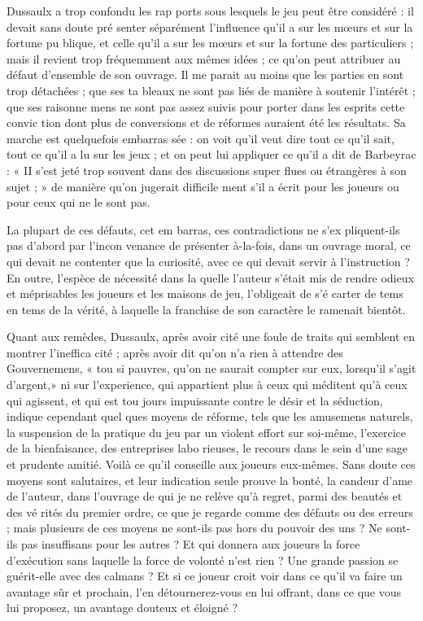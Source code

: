 Dussaulx a trop confondu les rap%
ports sous lesquels le jeu peut être
considéré : il devait sans doute pré%
senter séparément l'influence qu'il a
sur les mœurs et sur la fortune pu%
blique, et celle qu'il a sur les mœurs
et sur la fortune des particuliers ;
mais il revient trop fréquemment aux
mêmes idées ; ce qu'on peut attribuer
au défaut d'ensemble de son ouvrage.
Il me parait au moins que les parties
en sont trop détachées ; que ses ta%
bleaux ne sont pas liés de manière à
soutenir l'intérêt ; que ses raisonne%
mens ne sont pas assez suivis pour
porter dans les esprits cette convic%
tion dont plus de conversions et de
réformes auraient été les résultats.
Sa marche est quelquefois embarras%
sée : on voit qu'il veut dire tout ce
qu'il sait, tout ce qu'il a lu sur les
jeux ; et on peut lui appliquer ce qu'il
a dit de Barbeyrac : « II s'est jeté trop
souvent dans des discussions super%
flues ou étrangères à son sujet ; »
de manière qu'on jugerait difficile%
ment s'il a écrit pour les joueurs ou
pour ceux qui ne le sont pas.

La plupart de ces défauts, cet em%
barras, ces contradictions ne s'ex%
pliquent-ils pas d'abord par l'incon%
venance de présenter à-la-fois, dans
un ouvrage moral, ce qui devait ne
contenter que la curiosité, avec ce
qui devait servir à l'instruction ? En
outre, l'espèce de nécessité dans la%
quelle l'auteur s'était mis de rendre
odieux et méprisables les joueurs et
les maisons de jeu, l'obligeait de s'é%
carter de tems en tems de la vérité, à
laquelle la franchise de son caractère
le ramenait bientôt.

Quant aux remèdes, Dussaulx,
après avoir cité une foule de traits
qui semblent en montrer l'ineffica%
cité ; après avoir dit qu'on n'a rien à
attendre des Gouvernemens, « tou%
si pauvres, qu'on ne saurait 
compter sur eux, lorsqu'il s'agit
d'argent,» ni sur l'experience, qui
appartient plus à ceux qui méditent
qu'à ceux qui agissent, et qui est tou%
jours impuissante contre le désir et la
séduction, indique cependant quel%
ques moyens de réforme, tels que les
amusemens naturels, la suspension
de la pratique du jeu par un violent
effort sur soi-même, l'exercice de la
bienfaisance, des entreprises labo%
rieuses, le recours dans le sein d'une
sage et prudente amitié. Voilà ce qu'il
conseille aux joueurs eux-mêmes.
Sans doute ces moyens sont salutaires,
et leur indication seule prouve la
bonté, la candeur d'ame de l'auteur,
dans l'ouvrage de qui je ne relève qu'à
regret, parmi des beautés et des vé%
rités du premier ordre, ce que je
regarde comme des défauts ou des
erreurs ; mais plusieurs de ces moyens
ne sont-ils pas hors du pouvoir des
uns ? Ne sont-ils pas insuffisans pour
les autres ? Et qui donnera aux joueurs
la force d'exécution sans laquelle la
force de volonté n'est rien ? Une
grande passion se guérit-elle avec des
calmans ? Et si ce joueur croit voir
dans ce qu'il va faire un avantage sûr
et prochain, l'en détournerez-vous
en lui offrant, dans ce que vous lui
proposez, un avantage douteux et éloigné ?

